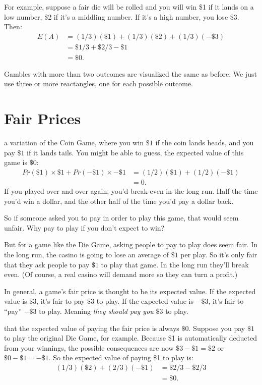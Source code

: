 \documentclass[justified]{tufte-book}
\newcommand{\p}{Pr}
\newcommand{\E}{E}
\theoremstyle{definition}
\theoremstyle{definition}
\theoremstyle{definition}
\theoremstyle{remark}
\begin{document}
For example, suppose a fair die will be rolled and you will win \$1 if it lands on a low number, \$2 if it's a middling number. If it's a high number, you lose \$3. Then:
\[
  \begin{aligned}
    \E(A) &= (1/3)(\$1) + (1/3)(\$2) + (1/3)(-\$3)\\
          &= \$1/3 + \$2/3 - \$1\\
          &= \$0.
  \end{aligned}
\]

Gambles with more than two outcomes are visualized the same as before. We just use three or more reactangles, one for each possible outcome.

\hypertarget{fair-prices}{%
\section{Fair Prices}\label{fair-prices}}

 a variation of the Coin Game, where you win \(\$1\) if the coin lands heads, and you pay \(\$1\) if it lands tails. You might be able to guess, the expected value of this game is \(\$0\):
\[
  \begin{aligned}
    \p(\$1) \times \$1 + \p(-\$1) \times -\$1 &= (1/2)(\$1) + (1/2)(-\$1)\\
      &= 0.
  \end{aligned}
\]
If you played over and over again, you'd break even in the long run. Half the time you'd win a dollar, and the other half of the time you'd pay a dollar back.

So if someone asked you to pay in order to play this game, that would seem unfair. Why pay to play if you don't expect to win?

But for a game like the Die Game, asking people to pay to play does seem fair. In the long run, the casino is going to lose an average of \(\$1\) per play. So it's only fair that they ask people to pay \(\$1\) to play that game. In the long run they'll break even. (Of course, a real casino will demand more so they can turn a profit.)

In general, a game's fair price is thought to be its expected value. If the expected value is \(\$3\), it's fair to pay \(\$3\) to play. If the expected value is \(-\$3\), it's fair to ``pay'' \(-\$3\) to play. Meaning \emph{they should pay you} \(\$3\) to play.

 that the expected value of paying the fair price is always \(\$0\). Suppose you pay \(\$1\) to play the original Die Game, for example. Because \$1 is automatically deducted from your winnings, the possible consequences are now \(\$3 - \$1 = \$2\) or \(\$0 - \$1 = -\$1\). So the expected value of paying \$1 to play is:
\[
  \begin{aligned}
    (1/3)(\$2) + (2/3)(-\$1) &= \$2/3 - \$2/3\\
      &= \$0.
  \end{aligned}
\]
\end{document}
